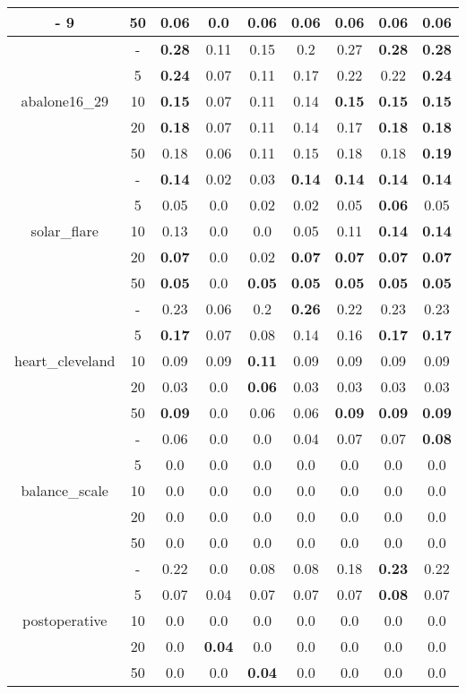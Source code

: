 \documentclass{article}%
\begin{document}
\begin{longtable}{c|c|ccccccc}
{-%
9}%
&50&\textbf{0.06}&0.0&\textbf{0.06}&\textbf{0.06}&\textbf{0.06}&\textbf{0.06}&\textbf{0.06}\\%
\hline%
\multirow{5}{*}{abalone16\_29}&{-}&\textbf{0.28}&0.11&0.15&0.2&0.27&\textbf{0.28}&\textbf{0.28}\\%
\cline{2%
-%
9}%
&5&\textbf{0.24}&0.07&0.11&0.17&0.22&0.22&\textbf{0.24}\\%
\cline{2%
-%
9}%
&10&\textbf{0.15}&0.07&0.11&0.14&\textbf{0.15}&\textbf{0.15}&\textbf{0.15}\\%
\cline{2%
-%
9}%
&20&\textbf{0.18}&0.07&0.11&0.14&0.17&\textbf{0.18}&\textbf{0.18}\\%
\cline{2%
-%
9}%
&50&0.18&0.06&0.11&0.15&0.18&0.18&\textbf{0.19}\\%
\hline%
\multirow{5}{*}{solar\_flare}&{-}&\textbf{0.14}&0.02&0.03&\textbf{0.14}&\textbf{0.14}&\textbf{0.14}&\textbf{0.14}\\%
\cline{2%
-%
9}%
&5&0.05&0.0&0.02&0.02&0.05&\textbf{0.06}&0.05\\%
\cline{2%
-%
9}%
&10&0.13&0.0&0.0&0.05&0.11&\textbf{0.14}&\textbf{0.14}\\%
\cline{2%
-%
9}%
&20&\textbf{0.07}&0.0&0.02&\textbf{0.07}&\textbf{0.07}&\textbf{0.07}&\textbf{0.07}\\%
\cline{2%
-%
9}%
&50&\textbf{0.05}&0.0&\textbf{0.05}&\textbf{0.05}&\textbf{0.05}&\textbf{0.05}&\textbf{0.05}\\%
\hline%
\multirow{5}{*}{heart\_cleveland}&{-}&0.23&0.06&0.2&\textbf{0.26}&0.22&0.23&0.23\\%
\cline{2%
-%
9}%
&5&\textbf{0.17}&0.07&0.08&0.14&0.16&\textbf{0.17}&\textbf{0.17}\\%
\cline{2%
-%
9}%
&10&0.09&0.09&\textbf{0.11}&0.09&0.09&0.09&0.09\\%
\cline{2%
-%
9}%
&20&0.03&0.0&\textbf{0.06}&0.03&0.03&0.03&0.03\\%
\cline{2%
-%
9}%
&50&\textbf{0.09}&0.0&0.06&0.06&\textbf{0.09}&\textbf{0.09}&\textbf{0.09}\\%
\hline%
\multirow{5}{*}{balance\_scale}&{-}&0.06&0.0&0.0&0.04&0.07&0.07&\textbf{0.08}\\%
\cline{2%
-%
9}%
&5&0.0&0.0&0.0&0.0&0.0&0.0&0.0\\%
\cline{2%
-%
9}%
&10&0.0&0.0&0.0&0.0&0.0&0.0&0.0\\%
\cline{2%
-%
9}%
&20&0.0&0.0&0.0&0.0&0.0&0.0&0.0\\%
\cline{2%
-%
9}%
&50&0.0&0.0&0.0&0.0&0.0&0.0&0.0\\%
\hline%
\multirow{5}{*}{postoperative}&{-}&0.22&0.0&0.08&0.08&0.18&\textbf{0.23}&0.22\\%
\cline{2%
-%
9}%
&5&0.07&0.04&0.07&0.07&0.07&\textbf{0.08}&0.07\\%
\cline{2%
-%
9}%
&10&0.0&0.0&0.0&0.0&0.0&0.0&0.0\\%
\cline{2%
-%
9}%
&20&0.0&\textbf{0.04}&0.0&0.0&0.0&0.0&0.0\\%
\cline{2%
-%
9}%
&50&0.0&0.0&\textbf{0.04}&0.0&0.0&0.0&0.0\\%
\hline%
\end{longtable}
\end{document}
